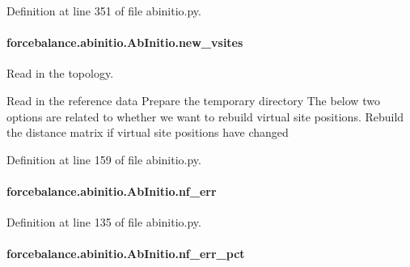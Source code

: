 Definition at line 351 of file abinitio.\-py.

\hypertarget{classforcebalance_1_1abinitio_1_1AbInitio_a64f1aeadac4d7b09424c20b83e5ad5af}{
\paragraph[{new\-\_\-vsites}]{\setlength{\rightskip}{0pt plus 5cm}forcebalance.\-abinitio.\-Ab\-Initio.\-new\-\_\-vsites\hspace{0.3cm}{\ttfamily [inherited]}}}\label{classforcebalance_1_1abinitio_1_1AbInitio_a64f1aeadac4d7b09424c20b83e5ad5af}


Read in the topology. 

Read in the reference data Prepare the temporary directory The below two options are related to whether we want to rebuild virtual site positions. Rebuild the distance matrix if virtual site positions have changed 

Definition at line 159 of file abinitio.\-py.

\hypertarget{classforcebalance_1_1abinitio_1_1AbInitio_a89de620e9aa500481c9e1ded99e14f72}{
\paragraph[{nf\-\_\-err}]{\setlength{\rightskip}{0pt plus 5cm}forcebalance.\-abinitio.\-Ab\-Initio.\-nf\-\_\-err\hspace{0.3cm}{\ttfamily [inherited]}}}\label{classforcebalance_1_1abinitio_1_1AbInitio_a89de620e9aa500481c9e1ded99e14f72}


Definition at line 135 of file abinitio.\-py.

\hypertarget{classforcebalance_1_1abinitio_1_1AbInitio_a184edac2cb27a999c363595ea59d8163}{
\paragraph[{nf\-\_\-err\-\_\-pct}]{\setlength{\rightskip}{0pt plus 5cm}forcebalance.\-abinitio.\-Ab\-Initio.\-nf\-\_\-err\-\_\-pct\hspace{0.3cm}{\ttfamily [inherited]}}}\label{classforcebalance_1_1abinitio_1_1AbInitio_a184edac2cb27a999c363595ea59d8163}


